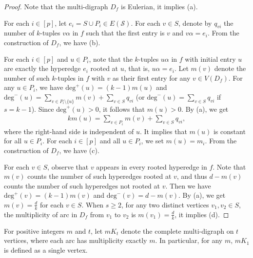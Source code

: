 \documentclass{article}
\begin{document}
\begin{proof}

Note that the multi-digraph $D_f$ is Eulerian, it implies (a).

For each $i \in [p]$, let $e_i =S \cup P_i \in E(\mathcal{S})$.
For each $v \in S$, denote by $q_{vi}$ the number of $k$-tuples $v\alpha$ in $f$ such that the first entry is $v$ and $v\alpha=e_i$.
From the construction of $D_{f}$,  we have (b).


For each $i \in [p]$ and $u \in P_{i}$,
note that the $k$-tuples $u\alpha$ in $f$ with initial entry $u$ are exactly the hyperedge $e_i$ rooted at $u$, that is, $u\alpha=e_i$.
Let $m(v)$ denote the number of such $k$-tuples in $f$ with $v$ as their first entry for any $v \in V(D_{f})$.
For any $u \in P_{i}$,  we have $\mathrm{deg}^+(u)=(k-1)m(u)$
and $\mathrm{deg}^-(u)=\sum_{v\in P_{i}\setminus\{u\}}m(v)+\sum_{v\in S}q_{vi}$
(or $\mathrm{deg}^-(u)=\sum_{v\in S}q_{vi}$ if $s=k-1$).
Since $\mathrm{deg}^+(u)>0$, it follows that $m(u) >0$.
By (a),
we get
\begin{align}\label{eqpi}
km(u)=\sum_{v\in P_{i}}m(v)+\sum_{v\in S}q_{vi},
\end{align}
where the right-hand side is independent of $u$. It implies that $m(u)$ is constant for all $u \in P_{i}$.
For each $i \in [p]$ and all $u \in P_{i}$, we set $m(u)=m_{i}$.
From the construction of $D_{f}$, we have (c).



For each $v \in S$, observe that $v$ appears in every rooted hyperedge in $f$.
Note that $m(v)$ counts the number of such hyperedges rooted at $v$,
and thus $d-m(v)$ counts the number of such hyperedges not rooted at $v$.
Then we have $\mathrm{deg}^+(v)=(k-1)m(v)$ and $\mathrm{deg}^-(v)=d-m(v)$.
By (a),
we get $m(v)=\frac{d}{k}$ for each $v \in S$.
When $s \geq 2$, for any two distinct vertices $v_1,v_2 \in S$, the multiplicity of arc in $D_f$ from $v_1$ to $v_2$ is $m(v_1)=\frac{d}{k}$, it implies (d).
\end{proof}


For positive integers $m$ and $t$, let $mK_t$ denote the complete multi-digraph on $t$ vertices, where each arc has multiplicity exactly $m$.
In particular, for any $m$, $mK_1$ is defined as a single vertex.
\end{document}

